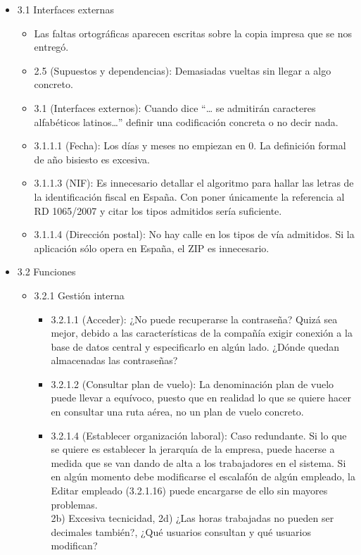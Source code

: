 \documentclass[11pt, a4paper, twoside, titlepage]{article}
\begin{document}
\begin{itemize}
\begin{itemize}
\begin{itemize}
							\item 3.1 Interfaces externas 
								\begin{itemize}
								\item Las faltas ortográficas aparecen escritas sobre la copia impresa que se nos entregó. 
								\item 2.5 (Supuestos y dependencias): Demasiadas vueltas sin llegar a algo concreto. 
								\item 3.1 (Interfaces externos): Cuando dice “… se admitirán caracteres alfabéticos latinos…” definir una codificación concreta o no decir nada. 
								\item 3.1.1.1 (Fecha): Los días y meses no empiezan en 0. La definición formal de año bisiesto es excesiva. 
								\item 3.1.1.3 (NIF): Es innecesario detallar el algoritmo para hallar las letras de la identificación fiscal en España. Con poner únicamente la referencia al RD 1065/2007 y citar los tipos admitidos sería suficiente. 
								\item 3.1.1.4 (Dirección postal): No hay calle en los tipos de vía admitidos. Si la aplicación sólo opera en España, el ZIP es innecesario.
								\end{itemize}
							\item  3.2 Funciones 
								\begin{itemize}
								\item 3.2.1 Gestión interna
									\begin{itemize}
									\item 3.2.1.1 (Acceder): ¿No puede recuperarse la contraseña? 
										Quizá sea mejor, debido a las características de la compañía exigir conexión a la base de datos central y especificarlo en algún lado. ¿Dónde quedan almacenadas las contraseñas?
									\item 3.2.1.2 (Consultar plan de vuelo): La denominación plan de vuelo puede llevar a equívoco, puesto que en realidad lo que se quiere hacer en consultar una ruta aérea, no un plan de vuelo concreto. 
									\item 3.2.1.4 (Establecer organización laboral): Caso redundante. Si lo que se quiere es establecer la jerarquía de la empresa, puede hacerse a medida que se van dando de alta a los trabajadores en el sistema. Si en algún momento debe modificarse el escalafón de algún empleado, la Editar empleado (3.2.1.16) puede encargarse de ello sin mayores problemas. \\
									 2b) Excesiva tecnicidad, 2d) ¿Las horas trabajadas no pueden ser decimales también?, ¿Qué usuarios consultan y qué usuarios modifican? 

\end{itemize}
\end{itemize}
\end{itemize}
\end{itemize}
\end{itemize}
\end{document}

